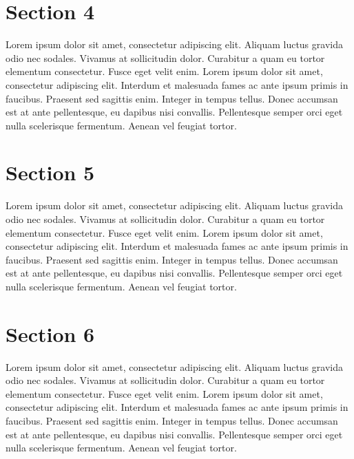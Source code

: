 \thispagestyle{fancy}

\section{Section 4}
Lorem ipsum dolor sit amet, consectetur adipiscing elit. Aliquam luctus gravida odio nec sodales. Vivamus at sollicitudin dolor. Curabitur a quam eu tortor elementum consectetur. Fusce eget velit enim. Lorem ipsum dolor sit amet, consectetur adipiscing elit. Interdum et malesuada fames ac ante ipsum primis in faucibus. Praesent sed sagittis enim. Integer in tempus tellus. Donec accumsan est at ante pellentesque, eu dapibus nisi convallis. Pellentesque semper orci eget nulla scelerisque fermentum. Aenean vel feugiat tortor.

\thispagestyle{fancy}

\section{Section 5}
Lorem ipsum dolor sit amet, consectetur adipiscing elit. Aliquam luctus gravida odio nec sodales. Vivamus at sollicitudin dolor. Curabitur a quam eu tortor elementum consectetur. Fusce eget velit enim. Lorem ipsum dolor sit amet, consectetur adipiscing elit. Interdum et malesuada fames ac ante ipsum primis in faucibus. Praesent sed sagittis enim. Integer in tempus tellus. Donec accumsan est at ante pellentesque, eu dapibus nisi convallis. Pellentesque semper orci eget nulla scelerisque fermentum. Aenean vel feugiat tortor.

\thispagestyle{fancy}

\section{Section 6}
Lorem ipsum dolor sit amet, consectetur adipiscing elit. Aliquam luctus gravida odio nec sodales. Vivamus at sollicitudin dolor. Curabitur a quam eu tortor elementum consectetur. Fusce eget velit enim. Lorem ipsum dolor sit amet, consectetur adipiscing elit. Interdum et malesuada fames ac ante ipsum primis in faucibus. Praesent sed sagittis enim. Integer in tempus tellus. Donec accumsan est at ante pellentesque, eu dapibus nisi convallis. Pellentesque semper orci eget nulla scelerisque fermentum. Aenean vel feugiat tortor.

\thispagestyle{fancy}


